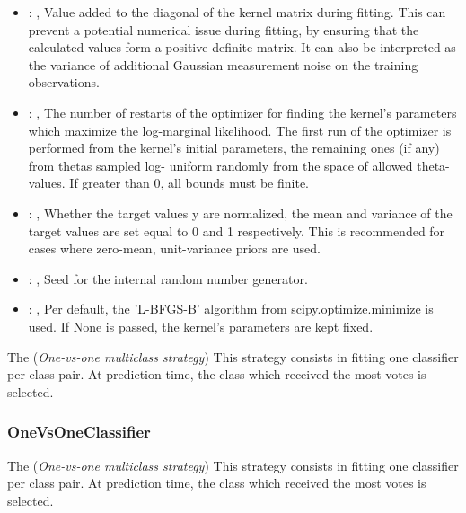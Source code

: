 \begin{itemize}
    \item {}: , 
      Value added to the diagonal of the kernel matrix during fitting. This can prevent a potential
      numerical issue during fitting, by ensuring that the calculated
      values form a positive definite matrix. It can also be interpreted as the variance of
      additional Gaussian measurement noise on the training observations.

    \item {}: , 
      The number of restarts of the optimizer for finding the kernel's parameters which maximize the
      log-marginal likelihood. The first run of the optimizer is performed
      from the kernel's initial parameters, the remaining ones (if any) from thetas sampled log-
      uniform randomly from the space of allowed theta-values. If greater than
      0, all bounds must be finite.

    \item {}: , 
      Whether the target values y are normalized, the mean and variance of the target values are set
      equal to 0 and 1 respectively. This is recommended for cases where zero-mean,
      unit-variance priors are used.

    \item {}: , 
      Seed for the internal random number generator.

    \item {}: , 
      Per default, the 'L-BFGS-B' algorithm from
      scipy.optimize.minimize is used. If None is passed, the kernel’s
      parameters are kept fixed.
  \end{itemize}
 The  (\textit{One-vs-one multiclass strategy})
 This strategy consists in fitting one classifier per class pair. At prediction time, the class
 which received the most votes is selected.

\subsubsection{OneVsOneClassifier}
  The  (\textit{One-vs-one multiclass strategy})
  This strategy consists in fitting one classifier per class pair. At prediction time, the class
  which received the most votes is selected.


